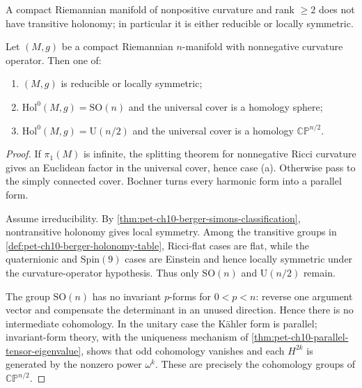 \begin{theorem}
  \label{thm:pet-ch10-rank-rigidity-nonpositive}

  A compact Riemannian manifold of nonpositive curvature and rank $\ge2$ does
  not have transitive holonomy; in particular it is either reducible or locally
  symmetric.
\end{theorem}

\begin{theorem}
  \label{thm:pet-ch10-gallot-meyer}

  Let $(M,g)$ be a compact Riemannian $n$-manifold with nonnegative curvature
  operator. Then one of:
  \begin{enumerate}
    \item[(a)] $(M,g)$ is reducible or locally symmetric;
    \item[(b)] $\mathrm{Hol}^0(M,g)=\mathrm{SO}(n)$ and the universal cover is a
      homology sphere;
    \item[(c)] $\mathrm{Hol}^0(M,g)=\mathrm U(n/2)$ and the universal cover is a
      homology $\mathbb{CP}^{n/2}$.
  \end{enumerate}
\end{theorem}
\begin{proof}
  \sketch
  If $\pi_1(M)$ is infinite, the splitting theorem for nonnegative Ricci
  curvature gives an Euclidean factor in the universal cover, hence case (a).
  Otherwise pass to the simply connected cover. Bochner turns every harmonic
  form into a parallel form.

  Assume irreducibility. By
  \cref{thm:pet-ch10-berger-simons-classification}, nontransitive holonomy gives
  local symmetry. Among the transitive groups in
  \cref{def:pet-ch10-berger-holonomy-table}, Ricci-flat cases are flat, while
  the quaternionic and $\mathrm{Spin}(9)$ cases are Einstein and hence locally
  symmetric under the curvature-operator hypothesis. Thus only
  $\mathrm{SO}(n)$ and $\mathrm U(n/2)$ remain.

  The group $\mathrm{SO}(n)$ has no invariant $p$-forms for $0<p<n$: reverse
  one argument vector and compensate the determinant in an unused direction.
  Hence there is no intermediate cohomology. In the unitary case the Kähler
  form is parallel; invariant-form theory, with the uniqueness mechanism of
  \cref{thm:pet-ch10-parallel-tensor-eigenvalue}, shows that odd cohomology
  vanishes and each $H^{2k}$ is generated by the nonzero power $\omega^k$.
  These are precisely the cohomology groups of $\mathbb{CP}^{n/2}$.
\end{proof}


